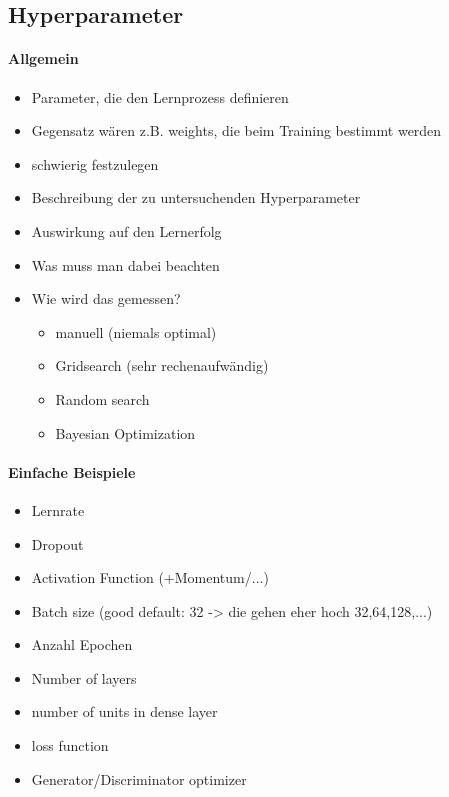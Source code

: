 \subsection{Hyperparameter}
\paragraph{Allgemein \cite{hyperparameters-search-in-machine-learning, hyperparameters-gan-using-genetic-algorithm}}
\begin{itemize}
	\item Parameter, die den Lernprozess definieren
	\item Gegensatz wären z.B. weights, die beim Training bestimmt werden
	\item schwierig festzulegen
	\item Beschreibung der zu untersuchenden Hyperparameter
	\item Auswirkung auf den Lernerfolg
	\item Was muss man dabei beachten
	\item Wie wird das gemessen?
	\begin{itemize}
		\item manuell (niemals optimal)
		\item Gridsearch (sehr rechenaufwändig)  \cite{hyperparameters-grid-search}
		\item Random search
		\item Bayesian Optimization
	\end{itemize}
\end{itemize}

\paragraph{Einfache Beispiele \cite{hyperparameters-gan-using-genetic-algorithm, hyperparameters-what-how}}
\begin{itemize}
	\item Lernrate
	\item Dropout
	\item Activation Function (+Momentum/...)
	\item Batch size (good default: 32 -> die gehen eher hoch 32,64,128,...)
	\item Anzahl Epochen
	\item Number of layers
	\item number of units in dense layer
	\item loss function
	\item Generator/Discriminator optimizer
\end{itemize}

